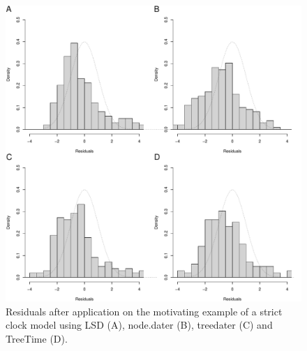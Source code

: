\documentclass{article}
\begin{document}
\begin{figure}[t!]
\begin{center}
\includegraphics[width=15cm]{exampleS2.pdf}
\end{center}
\caption{Residuals after application on the motivating example of a strict clock model using LSD (A), node.dater (B), treedater (C) and TreeTime (D).
\label{fig:exampleS2}}
\end{figure}
\end{document}
